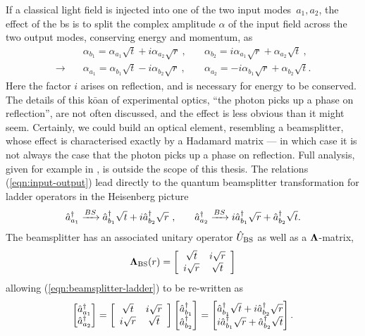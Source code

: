 If a classical light field is injected into one of the two input modes~$a_1, a_2$,  the effect of the \gls{bs} is to split the 
complex amplitude $\alpha$ of the input field across the two output modes, conserving energy and momentum, as
\begin{align}
    &\alpha_{b_1} = \alpha_{a_1} \sqrt{t} + i \alpha_{a_2} \sqrt{r}~,\quad
    &\alpha_{b_2} = i \alpha_{a_1} \sqrt{r} + \alpha_{a_2} \sqrt{t}~,\\
    \rightarrow \quad   &\alpha_{a_1} = \alpha_{b_1} \sqrt{t} - i \alpha_{b_2} \sqrt{r}~,\quad
    &\alpha_{a_2} = - i \alpha_{b_1} \sqrt{r} + \alpha_{b_2} \sqrt{t}.
    \label{eqn:input-output}
\end{align}
Here the factor $i$ arises on reflection, and is necessary for energy to be conserved. 
The details of this k$\mathrm{\bar{o}}$an of experimental optics, ``the photon picks up a phase on reflection'', are not often discussed, and the effect is less obvious than it might seem. 
Certainly, we could build an optical element, resembling a beamsplitter, whose effect is characterised exactly by a Hadamard matrix --- in which case it is not always the case that the photon picks up a phase on reflection.
Full analysis, given for example in \cite{Zetie2000}, is outside the scope of this thesis.
The relations (\ref{eqn:input-output}) lead directly to the quantum beamsplitter transformation for ladder operators in the Heisenberg picture
\begin{align}
    &\hat{a}^{\dagger}_{a_1}  \xrightarrow{BS} \hat{a}^{\dagger}_{b_1} \sqrt{t} + i \hat{a}^{\dagger}_{b_2} \sqrt{r} ~,\quad
    &\hat{a}^{\dagger}_{a_2}  \xrightarrow{BS} i \hat{a}^{\dagger}_{b_1} \sqrt{r} + \hat{a}^{\dagger}_{b_2} \sqrt{t}.
    \label{eqn:beamsplitter-ladder}
\end{align}
The beamsplitter has an associated unitary operator $\hat{U}_\mathrm{BS}$ as well as a $\mathbf{\Lambda}$-matrix, 
\begin{gather}
    \mathbf{\Lambda}_\mathrm{BS}(r)=
    \left[
    \begin{array}{cc}
        \sqrt{t} & i\sqrt{r} \\
        i\sqrt{r} & \sqrt{t} 
    \end{array}
\right]
\label{eqn:beamsplitter-unitary}
\end{gather}
allowing (\ref{eqn:beamsplitter-ladder}) to be re-written as 
\begin{gather}
\begin{bmatrix} \hat{a}^{\dagger}_{a_1}\\ \hat{a}^{\dagger}_{a_2} \end{bmatrix} 
=
\left[
\begin{array}{cc} \sqrt{t} & i\sqrt{r}\\ i\sqrt{r} & \sqrt{t} \end{array} 
\right]
\begin{bmatrix} \hat{a}^{\dagger}_{b_1}\\ \hat{a}^{\dagger}_{b_2} \end{bmatrix} 
=
\begin{bmatrix} 
    \hat{a}^{\dagger}_{b_1}\sqrt{t}  + i\hat{a}^{\dagger}_{b_2}\sqrt{r} \\ i\hat{a}^{\dagger}_{b_1}\sqrt{r} + \hat{a}^{\dagger}_{b_2}\sqrt{t} 
\end{bmatrix}.
\end{gather}
